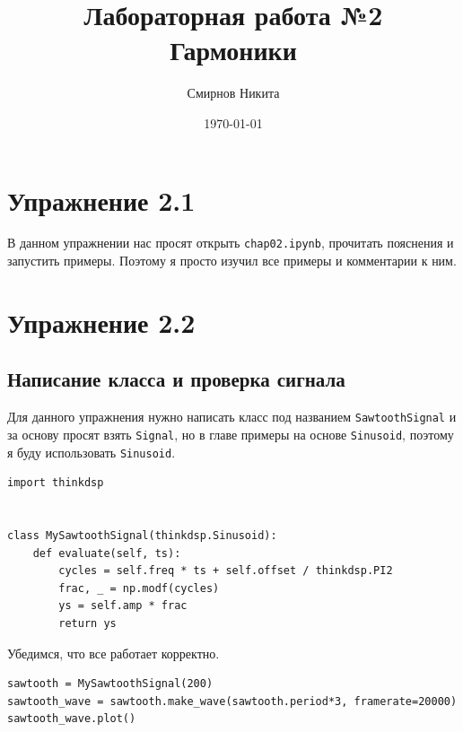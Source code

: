 \documentclass[a4paper,12pt]{report}
\title{Лабораторная работа №2\\Гармоники}
\author{Смирнов Никита}
\date{\today}
\begin{document}
\maketitle
\tableofcontents
\listoffigures
\lstlistoflistings

\maketitle

\chapter{Упражнение 2.1}

В данном упражнении нас просят открыть \texttt{chap02.ipynb}, прочитать пояснения и запустить примеры. Поэтому я просто изучил все примеры и комментарии к ним.

\chapter{Упражнение 2.2}
\section{Написание класса и проверка сигнала}

Для данного упражнения нужно написать класс под названием \texttt{SawtoothSignal} и за основу просят взять \texttt{Signal}, но в главе примеры на основе \texttt{Sinusoid}, поэтому я буду использовать \texttt{Sinusoid}.

\begin{lstlisting}[caption=Класс SawtoothSignal]
import thinkdsp


class MySawtoothSignal(thinkdsp.Sinusoid):    
    def evaluate(self, ts):
        cycles = self.freq * ts + self.offset / thinkdsp.PI2
        frac, _ = np.modf(cycles)
        ys = self.amp * frac
        return ys
\end{lstlisting}

Убедимся, что все работает корректно.

\begin{lstlisting}[caption=Визуализация пилообразного звука]
sawtooth = MySawtoothSignal(200)
sawtooth_wave = sawtooth.make_wave(sawtooth.period*3, framerate=20000)
sawtooth_wave.plot()
\end{lstlisting}
\end{document}
